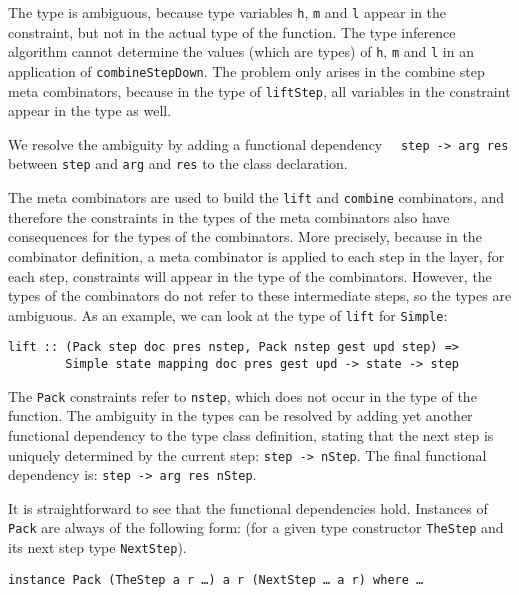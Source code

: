 \par The type is ambiguous, because type variables \texttt{h}, \texttt{m}
        and \texttt{l} appear in the constraint, but not in the actual type of the
        function. The type inference algorithm cannot determine the values (which are
        types) of \texttt{h}, \texttt{m} and \texttt{l} in an application of
        \texttt{combineStepDown}. The problem only arises in the combine step meta
        combinators, because in the type of \texttt{liftStep}, all variables in the
        constraint appear in the type as well.
\par We resolve the ambiguity by adding a functional dependency~\cite{fundep}~
        \texttt{step -> arg res} between \texttt{step} and \texttt{arg} and
        \texttt{res} to the class declaration.
\par The meta combinators are used to build the \texttt{lift} and
        \texttt{combine} combinators, and therefore the constraints in the types of the
        meta combinators also have consequences for the types of the combinators. More
        precisely, because in the combinator definition, a meta combinator is applied
        to each step in the layer, for each step, constraints will appear in the type
        of the combinators. However, the types of the combinators do not refer to these
        intermediate steps, so the types are ambiguous. As an example, we can look at
        the type of \texttt{lift} for \texttt{Simple}:\begin{small}\begin{verbatim}lift :: (Pack step doc pres nstep, Pack nstep gest upd step) =>
        Simple state mapping doc pres gest upd -> state -> step\end{verbatim}\end{small}

\par The \texttt{Pack} constraints refer to \texttt{nstep}, which does not
        occur in the type of the function. The ambiguity in the types can be resolved
        by adding yet another functional dependency to the type class definition,
        stating that the next step is uniquely determined by the current step: \texttt{step
        -> nStep}. The final functional dependency is: \texttt{step -> arg res
        nStep}. 
\par It is straightforward to see that the functional dependencies hold.
        Instances of \texttt{Pack} are always of the following form: (for a given type
        constructor \texttt{TheStep} and its next step type \texttt{NextStep}).\par
{\tt instance Pack (TheStep a r \dots) a r (NextStep \dots~a r) where \dots}

